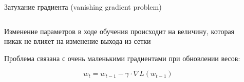 \documentclass[notes,12pt, aspectratio=169]{beamer}
\newenvironment{wideitemize}{\itemize\addtolength{\itemsep}{10pt}}{\enditemize}
\begin{document}
\begin{frame}{Затухание градиента (vanishing gradient problem)}

\begin{columns}
	\begin{column}{0.4\textwidth}
		\begin{wideitemize}
			\item  Изменение параметров в ходе обучения происходит на величину, которая никак не влияет на изменение выхода из сетки
			
			\item Проблема связана с очень маленькими градиентами при обновлении весов:
			
			$$
			w_t = w_{t-1} - \gamma \cdot \nabla L(w_{t-1})
			$$
			
		\end{wideitemize}
	\end{column}
	\hfill
	\begin{column}{0.6\textwidth}
		
		\begin{center}
		
		\end{center} 
	\end{column}
\end{columns}
\end{frame}
\end{document}
